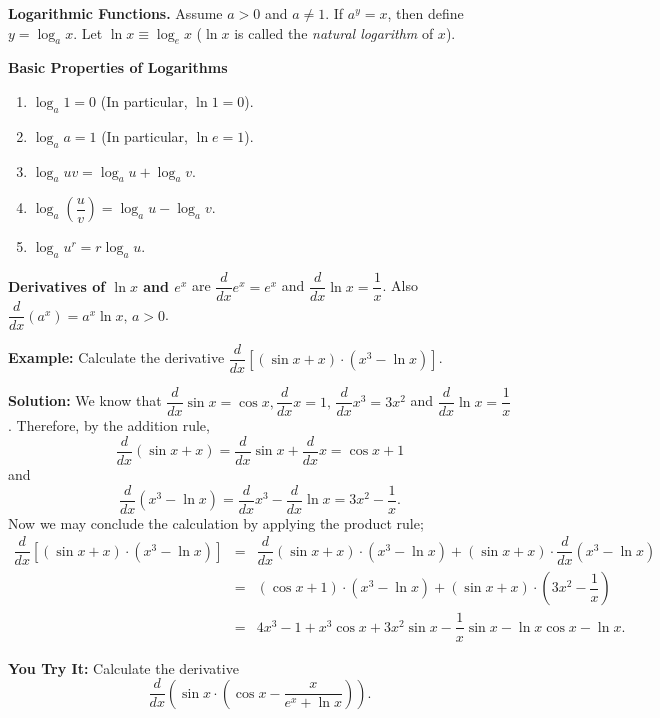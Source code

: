 \documentclass[titlepage,a4paper,12pt]{report}
\begin{document}
\noindent \textbf{Logarithmic Functions.} Assume $a>0$ and $a\neq 1$. If $a^y=x$, then define $y=\log _a x$. Let $\ln x \equiv \log _e x$ ($\ln x$ is called the \textit{natural logarithm} of $x$).

\noindent \textbf{Basic Properties of Logarithms}
\begin{enumerate}
\item $\log _a 1 =0$ (In particular, $\ln 1 =0$).
\item $\log _a a=1$ (In particular, $\ln e =1$).
\item $\log _a uv=\log _a u +\log _a v$.
\item $\log _a \left(\dfrac{u}{v}\right)=\log _a u-\log _a v$.
\item $\log _a u^r =r\log _a u$.
\end{enumerate}

\noindent \textbf{Derivatives of $\ln x$ and $e^x$} are $\dfrac{d}{dx}e^x=e^x$ and $\dfrac{d}{dx}\ln x =\dfrac{1}{x}$. Also $\dfrac{d}{dx}(a^x)=a^x\ln x, \, a>0$.

\noindent \textbf{Example:} Calculate the derivative $\dfrac{d}{dx}[(\sin x +x)\cdot (x^3-\ln x)]$.

\noindent \textbf{Solution:}  We know that $\dfrac{d}{dx} \sin x =\cos x, \dfrac{d}{dx} x=1, \, \dfrac{d}{dx}x^3=3x^2$ and $\dfrac{d}{dx}\ln x =\dfrac{1}{x}$. Therefore, by the addition rule, 
\begin{equation*}
\dfrac{d}{dx} (\sin x +x) =\dfrac{d}{dx}\sin x +\dfrac{d}{dx} x =\cos x +1
\end{equation*} 
and 
\begin{equation*}
\dfrac{d}{dx} (x^3-\ln x)=\dfrac{d}{dx}x^3-\dfrac{d}{dx}\ln x =3x^2-\dfrac{1}{x}.
\end{equation*}
Now we may conclude the calculation by applying the product rule;
\begin{eqnarray*}
\dfrac{d}{dx}[(\sin x +x)\cdot(x^3-\ln x)] &=& \dfrac{d}{dx} (\sin x +x)\cdot (x^3-\ln x) +(\sin x +x)\cdot \dfrac{d}{dx}(x^3-\ln x)\\
&=& (\cos x +1)\cdot (x^3-\ln x) +(\sin x +x)\cdot \left(3x^2-\dfrac{1}{x}\right)\\
&=& 4x^3-1 +x^3\cos x +3x^2\sin x -\dfrac{1}{x}\sin x -\ln x \cos x -\ln x. 
\end{eqnarray*}

\noindent \textbf{You Try It:} Calculate the derivative 
\begin{equation*}
\dfrac{d}{dx}\left(\sin x \cdot \left( \cos x -\dfrac{x}{e^x+\ln x}\right)\right).
\end{equation*}
\end{document}
